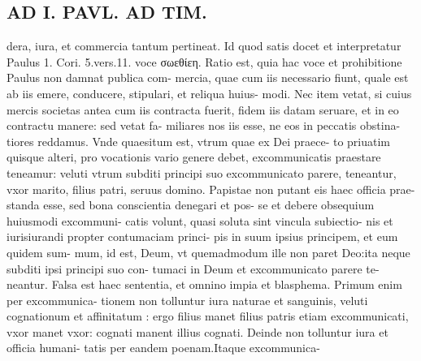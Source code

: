 \documentclass{article}
\begin{document}
\begin{pages}
\section*{AD I. PAVL. AD TIM. }
\marginpar{[ p.400 ]}\pstart dera, iura, et commercia tantum pertineat. Id quod satis docet et interpretatur Paulus 1. Cori. 5.vers.11. voce σωεθίεη. Ratio est, quia hac voce et prohibitione Paulus non damnat publica com- mercia, quae cum iis necessario fiunt, quale est ab iis emere, conducere, stipulari, et reliqua huius- modi. Nec item vetat, si cuius mercis societas antea cum iis contracta fuerit, fidem iis datam seruare, et in eo contractu manere: sed vetat fa- miliares nos iis esse, ne eos in peccatis obstina- tiores reddamus. Vnde quaesitum est, vtrum quae ex Dei praece- to priuatim quisque alteri, pro vocationis vario genere debet, excommunicatis praestare teneamur: veluti vtrum subditi principi suo excommunicato parere, teneantur, vxor marito, filius patri, seruus domino. Papistae non putant eis haec officia prae- standa esse, sed bona conscientia denegari et pos- se et debere obsequium huiusmodi excommuni- catis volunt, quasi soluta sint vincula subiectio- nis et iurisiurandi propter contumaciam princi- pis in suum ipsius principem, et eum quidem sum- mum, id est, Deum, vt quemadmodum ille non paret Deo:ita neque subditi ipsi principi suo con- tumaci in Deum et excommunicato parere te- neantur. Falsa est haec sententia, et omnino impia et blasphema. Primum enim per excommunica- tionem non tolluntur iura naturae et sanguinis, veluti cognationum et affinitatum : ergo filius manet filius patris etiam excommunicati, vxor manet vxor: cognati manent illius cognati. Deinde non tolluntur iura et officia humani- tatis per eandem poenam.Itaque excommunica-  \pend

\end{pages}
\end{document}

